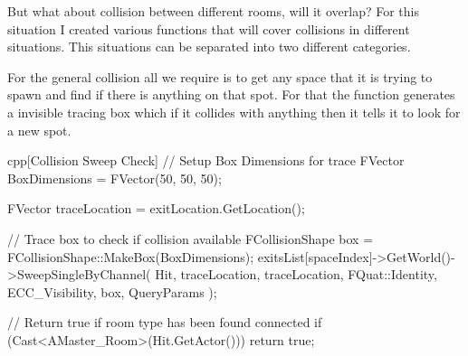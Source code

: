 \documentclass{../../Styles/AI-Research-STY}
\begin{document}
\begin{Form}
{{			But what about collision between different rooms, will it overlap? For this situation I created various functions
			that will cover collisions in different situations. This situations can be separated into two different categories.

            \begin{bulletBlockContent}
                 For the general collision all we require is to get any space that it is trying to spawn and
                find if there is anything on that spot. For that the function generates a invisible tracing box which if it collides
                with anything then it tells it to look for a new spot.
            \end{bulletBlockContent}
		}
	}

    \begin{codeBlock}{cpp}[Collision Sweep Check]
// Setup Box Dimensions for trace
FVector BoxDimensions = FVector(50, 50, 50);

FVector traceLocation = exitLocation.GetLocation();

// Trace box to check if collision available
FCollisionShape box = FCollisionShape::MakeBox(BoxDimensions);
exitsList[spaceIndex]->GetWorld()->SweepSingleByChannel(
    Hit,
    traceLocation,
    traceLocation,
    FQuat::Identity,
    ECC_Visibility,
    box,
    QueryParams
);

// Return true if room type has been found connected
if (Cast<AMaster_Room>(Hit.GetActor())) return true;
    \end{codeBlock}



\end{Form}
\end{document}
